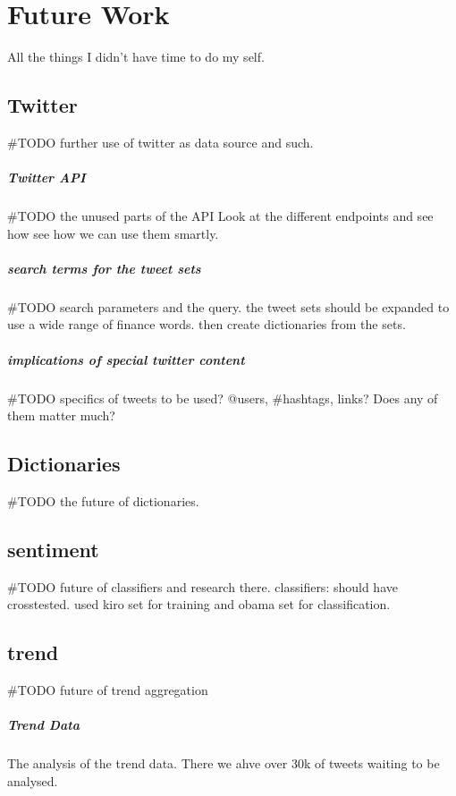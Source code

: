 \chapter{Future Work}\label{futurework}
All the things I didn't have time to do my self. 

\section{Twitter}
#TODO further use of twitter as data source and such.  

\paragraph{Twitter API}
#TODO the unused parts of the API
Look at the different endpoints and see how see how we can use them smartly.

\paragraph{search terms for the tweet sets}
#TODO search parameters and the query.
the tweet sets should be expanded to use a wide range of finance words. then
create dictionaries from the sets. 

\paragraph{implications of special twitter content}
#TODO specifics of tweets to be used?
@users, #hashtags, links? Does any of them matter much?

\section{Dictionaries}
#TODO the future of dictionaries.

\section{sentiment}
#TODO future of classifiers and research there.
classifiers:
should have crosstested. used kiro set for training and obama set for
classification.

\section{trend}
#TODO future of trend aggregation

\paragraph{Trend Data}
The analysis of the trend data. There we ahve over 30k of tweets waiting to be
analysed.
